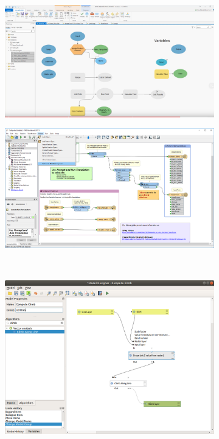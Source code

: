 
\begin{figure}
\centering
\begin{subfigure}[b]{0.45\linewidth}
  \graphicspath{{../../assets/images/background/geo-vpl/}}
  \centering
  \includegraphics[width=\linewidth]{arcgis.png}
  \caption{}\label{fig:gisvpl:1}
\end{subfigure}%
\qquad 
\begin{subfigure}[b]{0.45\linewidth}
  \graphicspath{{../../assets/images/background/geo-vpl/}}
  \centering
  \includegraphics[width=\linewidth]{fme.png}
  \caption{}\label{fig:gisvpl:2}
\end{subfigure}%
\\
\begin{subfigure}[c]{0.45\linewidth}
  \centering
  \graphicspath{{../../assets/images/background/geo-vpl/}}
  \includegraphics[width=\linewidth]{qgis.png}

\end{subfigure}
\end{figure}
